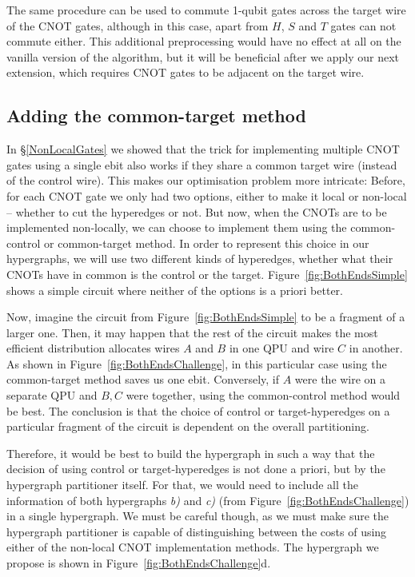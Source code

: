 

The same procedure can be used to commute 1-qubit gates across the target wire of the CNOT gates, although in this case, apart from \(H\), \(S\) and \(T\) gates can not commute either. This additional preprocessing would have no effect at all on the vanilla version of the algorithm, but it will be beneficial after we apply our next extension, which requires CNOT gates to be adjacent on the target wire.


\subsection{Adding the common-target method}
\label{BothEnds}

In \S\ref{NonLocalGates} we showed that the trick for implementing multiple CNOT gates using a single ebit also works if they share a common target wire (instead of the control wire). This makes our optimisation problem more intricate: Before, for each CNOT gate we only had two options, either to make it local or non-local -- whether to cut the hyperedges or not. But now, when the CNOTs are to be implemented non-locally, we can choose to implement them using the common-control or common-target method. In order to represent this choice in our hypergraphs, we will use two different kinds of hyperedges, whether what their CNOTs have in common is the control or the target. Figure~\ref{fig:BothEndsSimple} shows a simple circuit where neither of the options is a priori better. 



Now, imagine the circuit from Figure~\ref{fig:BothEndsSimple} to be a fragment of a larger one. Then, it may happen that the rest of the circuit makes the most efficient distribution allocates wires \(A\) and \(B\) in one QPU and wire \(C\) in another. As shown in Figure~\ref{fig:BothEndsChallenge}, in this particular case using the common-target method saves us one ebit. Conversely, if \(A\) were the wire on a separate QPU and \(B,C\) were together, using the common-control method would be best. The conclusion is that the choice of control or target-hyperedges on a particular fragment of the circuit is dependent on the overall partitioning. 

Therefore, it would be best to build the hypergraph in such a way that the decision of using control or target-hyperedges is not done a priori, but by the hypergraph partitioner itself. For that, we would need to include all the information of both hypergraphs \textit{b)} and \textit{c)} (from Figure~\ref{fig:BothEndsChallenge}) in a single hypergraph. We must be careful though, as we must make sure the hypergraph partitioner is capable of distinguishing between the costs of using either of the non-local CNOT implementation methods. The hypergraph we propose is shown in Figure~\ref{fig:BothEndsChallenge}d.

